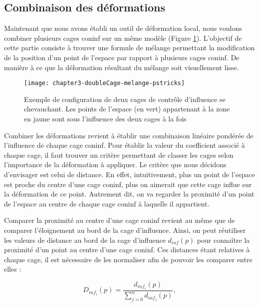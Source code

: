 \subsection{Combinaison des déformations}

Maintenant que nous avons établi un outil de déformation local, nous voulons
combiner plusieurs cages coninf sur un même modèle (Figure \ref{MELMC}).
L'objectif de cette partie consiste à trouver une formule de mélange
permettant la modification de la position d'un point de l'espace par rapport à
plusieurs cages coninf. De manière à ce que la déformation résultant du
mélange soit visuellement lisse.

\begin{figure}[ht]
  \begin{center}
    \texttt{[image: chapter3-doubleCage-melange-pstricks]}

    \caption[Mélange de cages de contrôle d'influence] {Exemple de
configuration de deux cages de contrôle d'influence se chevauchant. Les points
de l'espace (en vert) appartenant à la zone en jaune sont sous l'influence des
deux cages à la fois}

    \label{MELMC}
  \end{center}
\end{figure}

Combiner les déformations revient à établir une combinaison linéaire pondérée
de l'influence de chaque cage coninf. Pour établir la valeur du coefficient
associé à chaque cage, il faut trouver un critère permettant de classer les
cages selon l'importance de la déformation à appliquer. Le critère que nous
décidons d'envisager est celui de distance. En effet, intuitivement, plus
un point de l'espace est proche du centre d'une cage coninf, plus on aimerait
que cette cage influe sur la déformation de ce point. Autrement dit, on va
regarder la proximité d'un point de l'espace au centre de chaque cage coninf à
laquelle il appartient.

Comparer la proximité au centre d'une cage coninf revient au même que de
comparer l'éloignement au bord de la cage d'influence. Ainsi, on peut
réutiliser les valeurs de distance au bord de la cage d'influence $d_{inf}(p)$
pour connaître la proximité d'un point au centre d'une cage coninf. Ces
distances étant relatives à chaque cage, il est nécessaire de les normaliser
afin de pouvoir les comparer entre elles :

\begin{displaymath}
  D_{inf_i}(p) = \frac{d_{inf_i}(p)}{\sum_{j=0}^n d_{inf_j}(p)}, 
\end{displaymath}

